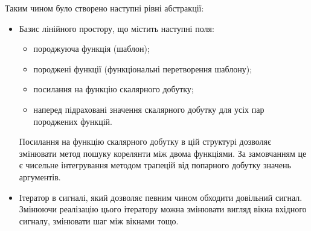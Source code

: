     Таким чином було створено наступні рівні абстракції:
    \begin{itemize}
        \item Базис лінійного простору, що містить наступні поля:
            \begin{itemize}
                \item породжуюча функція (шаблон);
                \item породжені функції (функціональні перетворення шаблону);
                \item посилання на функцію скалярного добутку;
                \item наперед підраховані значення скалярного добутку для усіх пар породжених функцій.
            \end{itemize}

            Посилання на функцію скалярного добутку в цій структурі дозволяє змінювати метод пошуку корелянти між
            двома функціями.
            За замовчанням це є чисельне інтегрування методом трапецій від попарного добутку значень аргументів.
        \item Ітератор в сигналі, який дозволяє певним чином обходити довільний сигнал.
            Змінюючи реалізацію цього ітератору можна змінювати вигляд вікна вхідного сигналу, змінювати шаг між
            вікнами тощо.
    \end{itemize}

